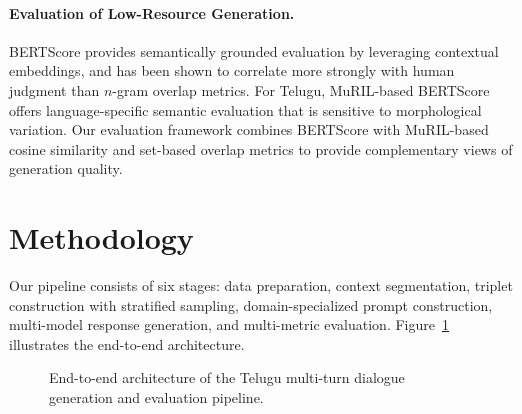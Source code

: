 \documentclass[11pt]{article}
\begin{document}
\paragraph{Evaluation of Low-Resource Generation.}
BERTScore \citep{zhang-etal-2020-bertscore} provides semantically grounded evaluation by leveraging contextual embeddings, and has been shown to correlate more strongly with human judgment than $n$-gram overlap metrics. For Telugu, MuRIL-based BERTScore offers language-specific semantic evaluation that is sensitive to morphological variation. Our evaluation framework combines BERTScore with MuRIL-based cosine similarity and set-based overlap metrics to provide complementary views of generation quality.

\section{Methodology}
\label{sec:methodology}

Our pipeline consists of six stages: data preparation, context segmentation, triplet construction with stratified sampling, domain-specialized prompt construction, multi-model response generation, and multi-metric evaluation. Figure~\ref{fig:pipeline} illustrates the end-to-end architecture.

\begin{figure}[t]
    \centering
    \caption{End-to-end architecture of the Telugu multi-turn dialogue generation and evaluation pipeline.}
    \label{fig:pipeline}
\end{figure}
\end{document}
